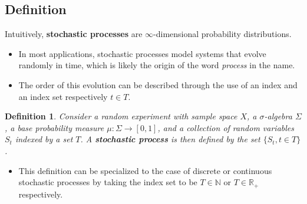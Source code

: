 \subsection{Definition}
\begin{frame}
Intuitively, \textbf{stochastic processes} are $\infty$-dimensional probability distributions.
\end{frame}

\begin{frame}
\begin{itemize}
\item In most applications, stochastic processes model systems that evolve randomly in time, which is likely the origin of the word \emph{process} in the name. 
\item The order of this evolution can be described through the use of an index and an index set respectively $t \in T$.
\end{itemize}

\newtheorem{stpo}{Definition}
\begin{stpo}
Consider a random experiment with sample space $X$, a $\sigma$-algebra $\Sigma$, a base probability measure $\mu : \Sigma \rightarrow [0,1]$, and a collection of random variables $S_t$ indexed by a set $T$. A \textbf{stochastic process} is then defined by the set $\{S_t, t \in T\}$.
\end{stpo}
\begin{itemize}
\item This definition can be specialized to the case of discrete or continuous stochastic processes by taking the index set to be $T \in \mathbb{N}$ or $T \in \mathbb{R}_+$ respectively.
\end{itemize}
\end{frame}